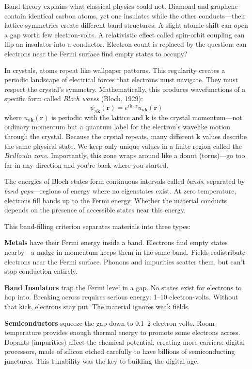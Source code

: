 Band theory explains what classical physics could not. Diamond and graphene contain identical carbon atoms, yet one insulates while the other conducts—their lattice symmetries create different band structures. A slight atomic shift can open a gap worth few electron-volts. A relativistic effect called spin-orbit coupling can flip an insulator into a conductor. Electron count is replaced by the question: \QSOpen{}can electrons near the Fermi surface find empty states to occupy?\QSClose{}

In crystals, atoms repeat like wallpaper patterns. This regularity creates a periodic landscape of electrical forces that electrons must navigate. They must respect the crystal's symmetry. Mathematically, this produces wavefunctions of a specific form called \emph{Bloch waves} (Bloch, 1929):
\[
\psi_{n\mathbf{k}}(\mathbf{r}) = e^{i\mathbf{k} \cdot \mathbf{r}} u_{n\mathbf{k}}(\mathbf{r})
\]
where \( u_{n\mathbf{k}}(\mathbf{r}) \) is periodic with the lattice and \( \mathbf{k} \) is the crystal momentum—not ordinary momentum but a quantum label for the electron's wavelike motion through the crystal. Because the crystal repeats, many different \( \mathbf{k} \) values describe the same physical state. We keep only unique values in a finite region called the \emph{Brillouin zone}. Importantly, this zone wraps around like a donut (torus)—go too far in any direction and you're back where you started.

The energies of Bloch states form continuous intervals called \emph{bands}, separated by \emph{band gaps}—regions of energy where no eigenstates exist. At zero temperature, electrons fill bands up to the Fermi energy. Whether the material conducts depends on the presence of accessible states near this energy.

This band-filling criterion separates materials into three types:

\textbf{Metals} have their Fermi energy inside a band. Electrons find empty states nearby—a nudge in momentum keeps them in the same band. Fields redistribute electrons near the Fermi surface. Phonons and impurities scatter them, but can't stop conduction entirely.

\textbf{Band Insulators} trap the Fermi level in a gap. No states exist for electrons to hop into. Breaking across requires serious energy: 1–10 electron-volts. Without that kick, electrons stay put. The material ignores weak fields.

\textbf{Semiconductors} squeeze the gap down to 0.1–2 electron-volts. Room temperature provides enough thermal energy to promote some electrons across. Dopants (impurities) affect the chemical potential, creating more carriers: digital processors, made of silicon etched carefully to have billions of semiconducting junctures. This tunability was the key to building the digital age.

